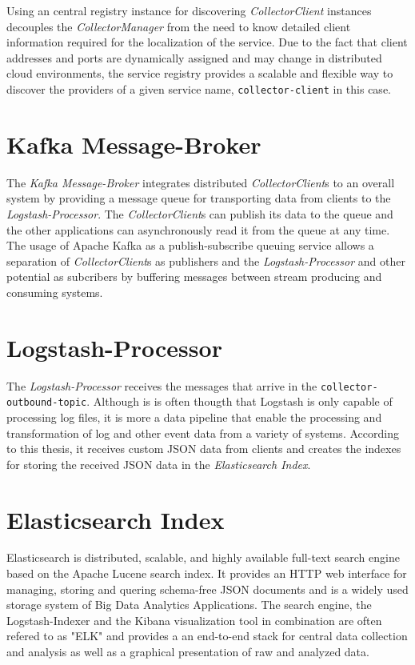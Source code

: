 Using an central registry instance for discovering \textit{CollectorClient} instances decouples the \textit{CollectorManager} from the
need to know detailed client information required for the localization of the service. Due to the fact that
client addresses and ports are dynamically assigned and may change in distributed cloud environments, the service registry provides
a scalable and flexible way to discover the providers of a given service name, \verb|collector-client| in this case.

\section{Kafka Message-Broker}

The \textit{Kafka Message-Broker} integrates distributed \textit{CollectorClient}s to an overall system by providing a
message queue for transporting data from clients to the \textit{Logstash-Processor}. The \textit{CollectorClient}s can publish
its data to the queue and the other applications can asynchronously read it from the queue at any time.
The usage of Apache Kafka as a publish-subscribe queuing service allows a separation of \textit{CollectorClient}s as publishers and the
\textit{Logstash-Processor} and other potential as subcribers by buffering messages between stream producing and consuming systems.

\section{Logstash-Processor}
The \textit{Logstash-Processor} receives the messages that arrive in the \verb|collector-outbound-topic|. Although is is often thougth that
Logstash is only capable of processing log files, it is more a data pipeline that enable the processing and transformation of log and other
event data from a variety of systems. According to this thesis, it receives custom JSON data from clients and creates the indexes
for storing the received JSON data in the \textit{Elasticsearch Index}.

\section{Elasticsearch Index}

Elasticsearch is distributed, scalable, and highly available full-text search engine based on the Apache Lucene search index.
It provides an HTTP web interface for managing, storing and quering schema-free JSON documents and is a widely used storage system
of Big Data Analytics Applications. The search engine, the Logstash-Indexer and the Kibana visualization tool in combination are
often refered to as "ELK" and provides a an end-to-end stack for central data collection and analysis as well as a graphical
presentation of raw and analyzed data.

